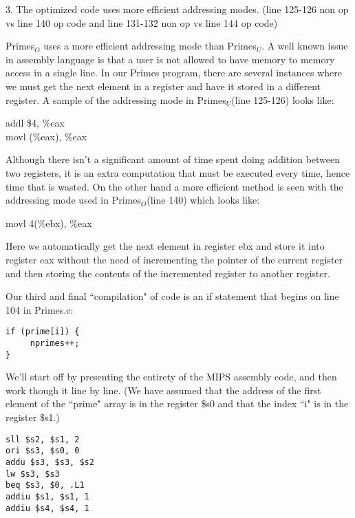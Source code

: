 \documentclass[11pt]{article}
\begin{document}
3. The optimized code uses more efficient addressing modes. (line 125-126 non op vs line 140 op code and line 131-132 non op vs line 144 op code)

Primes$_{O}$ uses a more efficient addressing mode than Primes$_{U}$. A well known issue in assembly language is that a user is not allowed to have memory to memory access in a single line. In our Primes program, there are several instances where we must get the next element in a register and have it stored in a different register. A sample of the addressing mode in Primes$_{U}$(line 125-126) looks like:


\hspace*{2.2in} addl \$4, \%eax \\

\hspace*{2.2in} movl (\%eax), \%eax 


Although there isn't a significant amount of time spent doing addition between two registers, it is an extra computation that must be executed every time, hence time that is wasted. On the other hand a more efficient method is seen with the addressing mode used in Primes$_{O}$(line 140) which looks like: 


\hspace*{2.2in} movl 4(\%ebx), \%eax


Here we automatically get the next element in register ebx and store it into register eax without the need of incrementing the pointer of the current register and then storing the contents of the incremented register to another register.




Our third and final ``compilation" of code is an if statement that begins on line 104 in Primes.c:
\begin{verbatim}
if (prime[i]) {
     nprimes++;
}
\end{verbatim}
We'll start off by presenting the entirety of the MIPS assembly code, and then work though it line by line. (We have assumed that the address of the first element of the ``prime" array is in the register \$s0 and that the index ``i" is in the register \$s1.)

\begin{verbatim}
sll $s2, $s1, 2
ori $s3, $s0, 0
addu $s3, $s3, $s2
lw $s3, $s3
beq $s3, $0, .L1
addiu $s1, $s1, 1
addiu $s4, $s4, 1
\end{verbatim}
\end{document}
